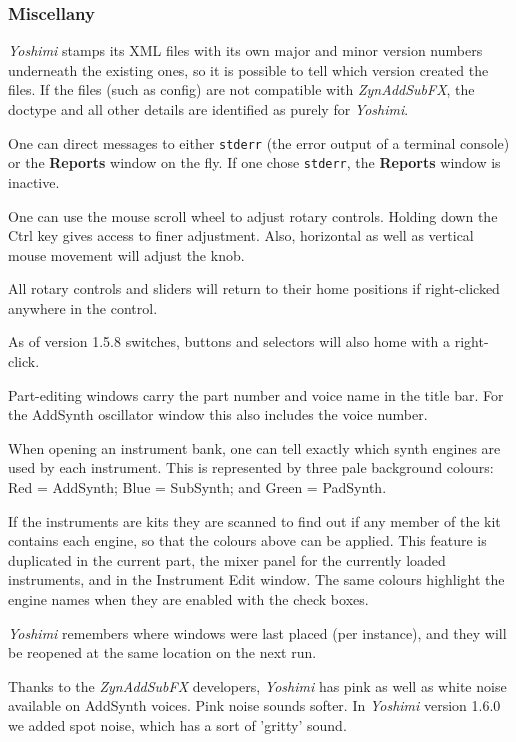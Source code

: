 \documentclass[
 11pt,
 twoside,
 a4paper,
 final                                 %
]{article}
\begin{document}
\subsubsection{Miscellany}
\label{subsubsec:new_features_miscellany}

   \textsl{Yoshimi} stamps its XML files with its own major
   and minor version numbers underneath the existing ones, so it is possible
   to tell which version created the files.
   If the files (such as config) are not compatible with
   \textsl{ZynAddSubFX}, the doctype and all other details are identified
   as purely for \textsl{Yoshimi}.

   One can direct messages to either \texttt{stderr}
   (the error output of a terminal console) or the \textbf{Reports} window
   on the fly. If one chose \texttt{stderr}, the \textbf{Reports} window is
   inactive.

   One can use the mouse scroll wheel to adjust rotary controls. Holding
   down the Ctrl key gives access to finer adjustment.  Also, horizontal as
   well as vertical mouse movement will adjust the knob.

   All rotary controls and sliders will return
   to their home positions if right-clicked anywhere in the control.

   As of version 1.5.8 switches, buttons and
   selectors will also home with a right-click.

   Part-editing windows carry the part number and voice name in the title
   bar. For the AddSynth oscillator window this also includes the voice
   number.

   When opening an instrument bank, one can tell exactly which synth
   engines are used by each instrument. This is represented by three pale
   background colours: Red = AddSynth; Blue = SubSynth; and Green = PadSynth.

   If the instruments are kits they are scanned to find out if any member of the
   kit contains each engine, so that the colours above can be applied.
   This feature is duplicated in the current part, the mixer panel for the
   currently loaded instruments, and in the Instrument Edit window.
   The same colours highlight the engine names when they are enabled with the
   check boxes.

   \textsl{Yoshimi} remembers where windows were last placed (per instance),
   and they will be reopened at the same location on the next run.

   Thanks to the \textsl{ZynAddSubFX} developers, \textsl{Yoshimi} has pink
   as well as white noise available on AddSynth voices. Pink noise sounds
   softer.  In \textsl{Yoshimi} version 1.6.0 we added spot noise, which has
   a sort of 'gritty' sound.
\end{document}

